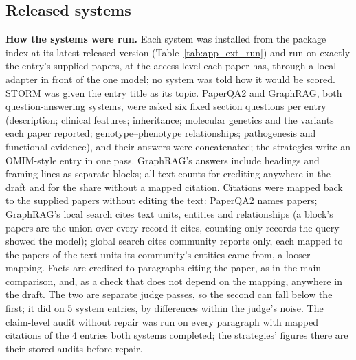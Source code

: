 \documentclass{article} %
\begin{document}
\subsection{Released systems}
\label{app:r2_ext}
\textbf{How the systems were run.} Each system was installed from the package index at its latest released version (Table~\ref{tab:app_ext_run}) and run on exactly the entry's supplied papers, at the access level each paper has, through a local adapter in front of the one model; no system was told how it would be scored. STORM was given the entry title as its topic. PaperQA2 and GraphRAG, both question-answering systems, were asked six fixed section questions per entry (description; clinical features; inheritance; molecular genetics and the variants each paper reported; genotype--phenotype relationships; pathogenesis and functional evidence), and their answers were concatenated; the strategies write an OMIM-style entry in one pass. GraphRAG's answers include headings and framing lines as separate blocks; all text counts for crediting anywhere in the draft and for the share without a mapped citation. Citations were mapped back to the supplied papers without editing the text: PaperQA2 names papers; GraphRAG's local search cites text units, entities and relationships (a block's papers are the union over every record it cites, counting only records the query showed the model); global search cites community reports only, each mapped to the papers of the text units its community's entities came from, a looser mapping. Facts are credited to paragraphs citing the paper, as in the main comparison, and, as a check that does not depend on the mapping, anywhere in the draft. The two are separate judge passes, so the second can fall below the first; it did on 5 system entries, by differences within the judge's noise. The claim-level audit without repair was run on every paragraph with mapped citations of the 4 entries both systems completed; the strategies' figures there are their stored audits before repair.
\end{document}
